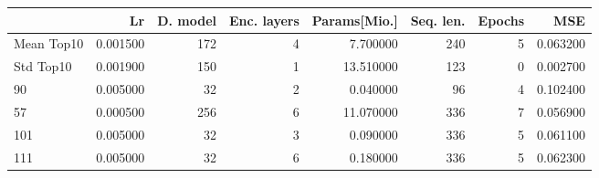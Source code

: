 \begin{tabular}{lrrrrrrr}
\toprule
 & Lr & D. model & Enc. layers & Params[Mio.] & Seq. len. & Epochs & MSE \\
\midrule
Mean Top10 & 0.001500 & 172 & 4 & 7.700000 & 240 & 5 & 0.063200 \\
Std Top10 & 0.001900 & 150 & 1 & 13.510000 & 123 & 0 & 0.002700 \\
90 & 0.005000 & 32 & 2 & 0.040000 & 96 & 4 & 0.102400 \\
57 & 0.000500 & 256 & 6 & 11.070000 & 336 & 7 & 0.056900 \\
101 & 0.005000 & 32 & 3 & 0.090000 & 336 & 5 & 0.061100 \\
111 & 0.005000 & 32 & 6 & 0.180000 & 336 & 5 & 0.062300 \\
\bottomrule
\end{tabular}
